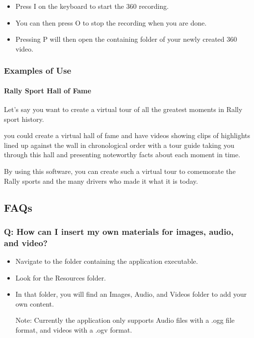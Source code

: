 \documentclass{article}
\begin{document}
			\begin{itemize}

				\item Press I on the keyboard to start the 360 recording.

				\item You can then press O to stop the recording when you are done.

				\item Pressing P will then open the containing folder of your newly created 360 video.

			\end{itemize}


		\subsubsection{Examples of Use}

			\paragraph{Rally Sport Hall of Fame}

				Let's say you want to create a virtual tour of all the greatest moments in Rally sport history.

				you could create a virtual hall of fame and have videos showing clips of highlights lined up against the wall in chronological order with a tour guide taking you through this hall and presenting noteworthy facts about each moment in time.
				
				By using this software, you can create such a virtual tour to comemorate the Rally sports and the many drivers who made it what it is today.




	\subsection{FAQs}

		\subsubsection{Q: How can I insert my own materials for images, audio, and video?}

			\begin{itemize}

				\item Navigate to the folder containing the application executable.

				\item Look for the Resources folder.

				\item In that folder, you will find an Images, Audio, and Videos folder to add your own content.

				Note: Currently the application only supports Audio files with a .ogg file format, and videos with a .ogv format.

			\end{itemize}
\end{document}
